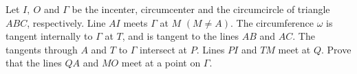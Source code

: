 Let $I,\ O$ and $\Gamma$ be the incenter, circumcenter and the circumcircle of triangle $ABC$, respectively. Line $AI$ meets $\Gamma$ at $M$ $(M\neq A)$. The circumference $\omega$ is tangent internally to $\Gamma$ at $T$, and is tangent to the lines $AB$ and $AC$. The tangents through $A$ and $T$ to $\Gamma$ intersect at $P$. Lines $PI$ and $TM$ meet at $Q$. Prove that the lines $QA$ and $MO$ meet at a point on $\Gamma$.